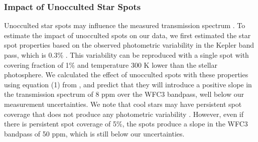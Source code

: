 \documentclass[twocolumn, trackchanges]{aastex61}
\begin{document}
\subsubsection{Impact of Unocculted Star Spots}
Unocculted star spots may influence the measured transmission spectrum \citep{mccullough14, zellem17}. To estimate the impact of unocculted spots on our data,  we first estimated the star spot properties based on the observed photometric variability in the Kepler band pass, which is 0.3\% \citep{dai17,mocnik17}. This variability can be reproduced with a single spot with covering fraction of 1\% and temperature 300 K lower than the stellar photosphere.  We calculated the effect of unocculted spots with these properties using equation (1) from \cite{mccullough14}, and predict that they will introduce a positive slope in the transmission spectrum of 8 ppm over the WFC3 bandpass, well below our measurement uncertainties. We note that cool stars may have persistent spot coverage that does not produce any photometric variability \citep{rackham18}. However, even if there is persistent spot coverage of 5\%, the spots produce a slope in the WFC3 bandpass of 50 ppm, which is still below our uncertainties.


\end{document}
